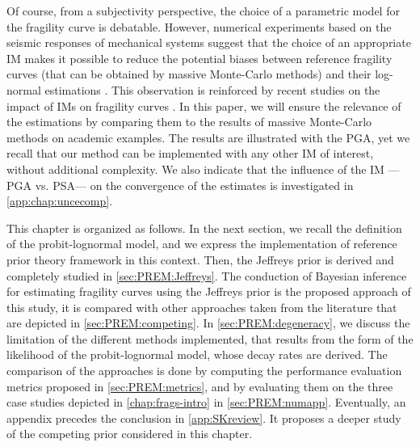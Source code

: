 Of course, from a subjectivity perspective, the choice of a parametric model for the fragility curve is debatable. However, numerical experiments based on the seismic responses of mechanical systems suggest that the choice of an appropriate IM makes it possible to reduce the potential biases between reference fragility curves (that can be obtained by massive Monte-Carlo methods) and their log-normal estimations \citep{gauchy_importance_2021}. This observation is reinforced by recent studies on the impact of IMs on fragility curves \citep{sainct_efficient_2020,ciano_role_2020,ciano_novel_2022}. In this paper, we will ensure the relevance of the estimations by comparing them to the results of massive Monte-Carlo methods on academic examples. 
The results are illustrated with the PGA, yet we recall that our method can be implemented with any other IM of interest, without additional complexity.
We also indicate that the influence of the IM ---PGA vs. PSA--- on the convergence of the estimates is investigated in   \cref{app:chap:uncecomp}.


This chapter is organized as follows. In the next section, we recall the definition of the probit-lognormal model, and we express the implementation of reference prior theory framework in this context.
Then, the Jeffreys prior is derived and completely studied in \cref{sec:PREM:Jeffreys}. The conduction of Bayesian inference for estimating fragility curves using the Jeffreys prior is the proposed approach of this study, it is compared with other approaches taken from the literature that are depicted in \cref{sec:PREM:competing}. %
In \cref{sec:PREM:degeneracy}, we discuss the limitation of the different methods implemented, that results from the form of the likelihood of the probit-lognormal model, whose decay rates are derived.
The comparison of the approaches is done by computing the performance evaluation metrics proposed in \cref{sec:PREM:metrics}, and by evaluating  them on the three case studies depicted in   \cref{chap:frags-intro} in \cref{sec:PREM:numapp}.
Eventually, an appendix precedes the conclusion in \cref{app:SKreview}. It proposes a deeper study of the competing prior considered in this chapter.





